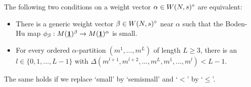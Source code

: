 \documentclass{article}
\begin{document}
\begin{thm} \label{iff} \samepage
  The following two conditions on a weight vector $\alpha \in W(N, s)^{\circ}$ are equivalent:
  \begin{itemize}
   \item[i)] There is a generic weight vector $\beta \in W(N, s)^{\circ}$ near $\alpha$ such that the Boden-Hu map $\phi_{\beta}: M(\underline{\mathbf{1}})^{\beta} \to
    M(\underline{\mathbf{1}})^{\alpha}$ is small.
   \item[ii)] For every ordered $\alpha$-partition $(m^1, \ldots, m^L)$ of length $L \geq 3$, there is an $l \in \{0, 1, \ldots, L-1\}$ with
    $\Delta( m^{l+1}, m^{l+2}, \ldots, m^L, m^1, \ldots, m^l) < L-1$.
  \end{itemize}
  The same holds if we replace `small' by `semismall' and `$<$' by `$\leq$'.
\end{thm}
\end{document}

